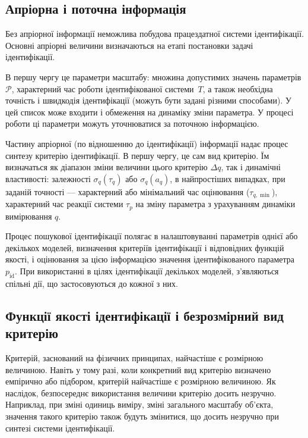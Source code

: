 \subsection{Апріорна і поточна інформація}%

Без апріорної інформації неможлива побудова працездатної системи ідентифікації.
Основні апріорні величини визначаються на етапі постановки задачі
ідентифікації.

В першу чергу це параметри масштабу: множина допустимих значень
параметрів \label{atu:d:p_set} \(\mathcal{P} \), характерний час роботи
ідентифікованої системи~$T$,
а також необхідна точність і швидкодія ідентифікації (можуть
бути задані різними способами). У цей список може входити і
обмеження на динаміку зміни параметра. У процесі роботи ці
параметри можуть уточнюватися за поточною інформацією.

Частину апріорної (по відношенню до ідентифікації) інформації
надає процес синтезу критерію ідентифікації. В першу чергу, це сам вид
критерію. Їм визначаться як діапазон зміни величини цього критерію
$\Delta q$\label{atu:d:Delta_q}, так і динамічні властивості: залежності
$\sigma_q (\tau_q)$ або $\sigma_q(a_q)$,
в найпростіших випадках, при заданій точності --- характерний або
мінімальний час оцінювання ($\tau_{q, \min}$),
характерний час реакції
системи $\tau_p$ на зміну параметра з урахуванням динаміки вимірювання $q$.

Процес пошукової ідентифікації полягає в налаштовуванні параметрів однієї або
декількох моделей, визначення критеріїв ідентифікації і відповідних функцій
якості, і оцінювання за цією інформацією значення ідентифікованого параметра
\label{atu:d:p_id}$p_\mathrm{id}$. При використанні в цілях
ідентифікації декількох моделей, з'являються спільні дії, що застосовуються до
кожної з них.




\subsection{Функції якості ідентифікації і безрозмірний вид критерію} %


Критерій, заснований на фізичних принципах, найчастіше є розмірною величиною.
Навіть у тому разі, коли конкретний вид критерію визначено емпірично або
підбором, критерій найчастіше є розмірною величиною.
Як наслідок, безпосереднє
використання величини критерію досить незручно. Наприклад, при зміні одиниць
виміру, зміні загального масштабу об'єкта, значення такого критерію також
будуть змінитися, що досить незручно при синтезі системи ідентифікації.

